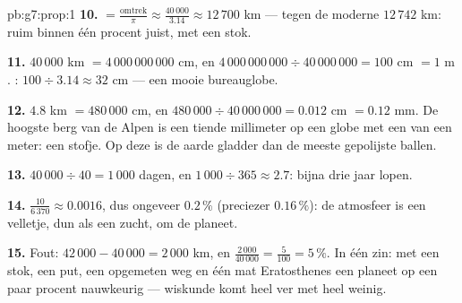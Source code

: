 \begin{solution}{pb:g7:prop:1}
\textbf{10.}  $= \frac{\text{omtrek}}{\pi} \approx
\frac{40\,000}{3.14} \approx 12\,700$ km --- tegen de moderne $12\,742$ km: ruim
binnen één procent juist, met een stok.

\textbf{11.} $40\,000$ km $= 4\,000\,000\,000$ cm, en
$4\,000\,000\,000 \div 40\,000\,000 = 100$ cm $= 1$ m . :
$100 \div 3.14 \approx 32$ cm --- een mooie bureauglobe.

\textbf{12.} $4.8$ km $= 480\,000$ cm, en
$480\,000 \div 40\,000\,000 = 0.012$ cm $= 0.12$ mm. De hoogste berg van de Alpen
is een tiende millimeter op een globe met een  van een meter: een stofje. Op
deze  is de aarde gladder dan de meeste gepolijste ballen.

\textbf{13.} $40\,000 \div 40 = 1\,000$ dagen, en $1\,000 \div 365 \approx 2.7$:
bijna drie jaar lopen.

\textbf{14.} $\frac{10}{6\,370} \approx 0.0016$, dus ongeveer $0.2\,\%$
(preciezer $0.16\,\%$): de atmosfeer is een velletje, dun als een zucht, om de
planeet.

\textbf{15.} Fout: $42\,000 - 40\,000 = 2\,000$ km, en
$\frac{2\,000}{40\,000} = \frac{5}{100} = 5\,\%$. In één zin: met een stok, een
put, een opgemeten weg en één  mat Eratosthenes een planeet op een paar
procent nauwkeurig --- wiskunde komt heel ver met heel weinig.
\end{solution}
